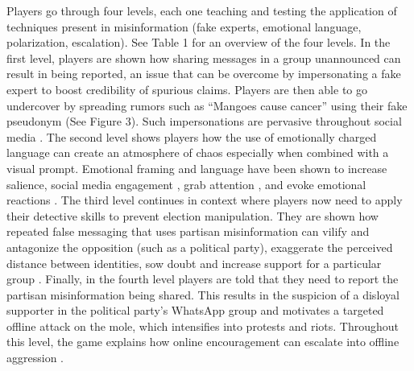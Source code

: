 \documentclass[empirical, authordate, issue]{jote-new-article}
\begin{document}
\emph{}Players go through four levels, each one teaching and testing the application of techniques present in misinformation (fake experts, emotional language, polarization, escalation). See Table 1 for an overview of the four levels. In the first level, players are shown how sharing messages in a group unannounced can result in being reported, an issue that can be overcome by impersonating a fake expert to boost credibility of spurious claims. Players are then able to go undercover by spreading rumors such as “Mangoes cause cancer” using their fake pseudonym (See Figure 3). Such impersonations are pervasive throughout social media \parencite{Adewole2017, Goga2015, Jung2011, Reznik2013}. The second level shows players how the use of emotionally charged language can create an atmosphere of chaos especially when combined with a visual prompt. Emotional framing and language have been shown to increase salience, social media engagement \parencite{Rathje2021}, grab attention \parencite{Konijn2012}, and evoke emotional reactions \parencite{Gross2004}. The third level continues in context where players now need to apply their detective skills to prevent election manipulation. They are shown how repeated false messaging that uses partisan misinformation can vilify and antagonize the opposition (such as a political party), exaggerate the perceived distance between identities, sow doubt and increase support for a particular group \parencite{Groenendyk2018, Iyengar2018, Melki2014}. Finally, in the fourth level players are told that they need to report the partisan misinformation being shared. This results in the suspicion of a disloyal supporter in the political party's \mbox{WhatsApp} group and motivates a targeted offline attack on the mole, which intensifies into protests and riots. Throughout this level, the game explains how online encouragement can escalate into offline aggression \parencite{BBCMonitoring2021, Robb2021}.
\end{document}
